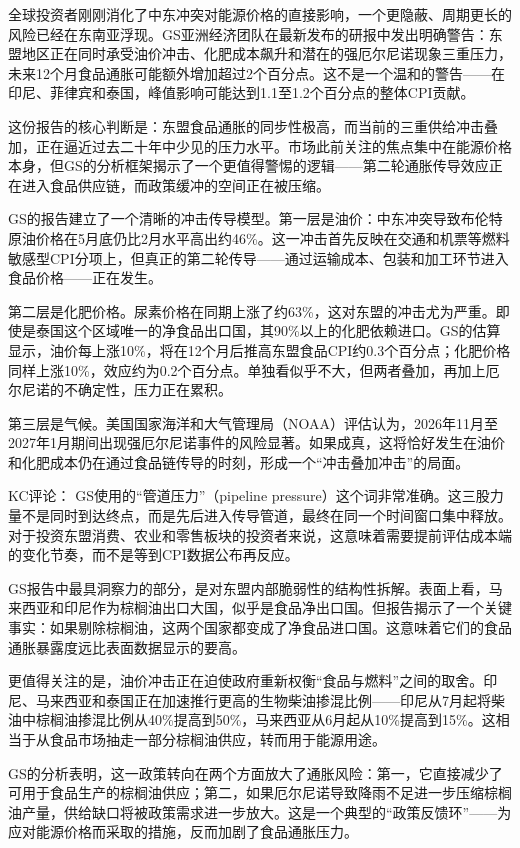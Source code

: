 \documentclass[11pt]{ctexart}
\begin{document}
全球投资者刚刚消化了中东冲突对能源价格的直接影响，一个更隐蔽、周期更长的风险已经在东南亚浮现。GS亚洲经济团队在最新发布的研报中发出明确警告：东盟地区正在同时承受油价冲击、化肥成本飙升和潜在的强厄尔尼诺现象三重压力，未来12个月食品通胀可能额外增加超过2个百分点。这不是一个温和的警告——在印尼、菲律宾和泰国，峰值影响可能达到1.1至1.2个百分点的整体CPI贡献。

这份报告的核心判断是：东盟食品通胀的同步性极高，而当前的三重供给冲击叠加，正在逼近过去二十年中少见的压力水平。市场此前关注的焦点集中在能源价格本身，但GS的分析框架揭示了一个更值得警惕的逻辑——第二轮通胀传导效应正在进入食品供应链，而政策缓冲的空间正在被压缩。

GS的报告建立了一个清晰的冲击传导模型。第一层是油价：中东冲突导致布伦特原油价格在5月底仍比2月水平高出约46\%。这一冲击首先反映在交通和机票等燃料敏感型CPI分项上，但真正的第二轮传导——通过运输成本、包装和加工环节进入食品价格——正在发生。

第二层是化肥价格。尿素价格在同期上涨了约63\%，这对东盟的冲击尤为严重。即使是泰国这个区域唯一的净食品出口国，其90\%以上的化肥依赖进口。GS的估算显示，油价每上涨10\%，将在12个月后推高东盟食品CPI约0.3个百分点；化肥价格同样上涨10\%，效应约为0.2个百分点。单独看似乎不大，但两者叠加，再加上厄尔尼诺的不确定性，压力正在累积。

第三层是气候。美国国家海洋和大气管理局（NOAA）评估认为，2026年11月至2027年1月期间出现强厄尔尼诺事件的风险显著。如果成真，这将恰好发生在油价和化肥成本仍在通过食品链传导的时刻，形成一个“冲击叠加冲击”的局面。

KC评论： GS使用的“管道压力”（pipeline pressure）这个词非常准确。这三股力量不是同时到达终点，而是先后进入传导管道，最终在同一个时间窗口集中释放。对于投资东盟消费、农业和零售板块的投资者来说，这意味着需要提前评估成本端的变化节奏，而不是等到CPI数据公布再反应。

GS报告中最具洞察力的部分，是对东盟内部脆弱性的结构性拆解。表面上看，马来西亚和印尼作为棕榈油出口大国，似乎是食品净出口国。但报告揭示了一个关键事实：如果剔除棕榈油，这两个国家都变成了净食品进口国。这意味着它们的食品通胀暴露度远比表面数据显示的要高。

更值得关注的是，油价冲击正在迫使政府重新权衡“食品与燃料”之间的取舍。印尼、马来西亚和泰国正在加速推行更高的生物柴油掺混比例——印尼从7月起将柴油中棕榈油掺混比例从40\%提高到50\%，马来西亚从6月起从10\%提高到15\%。这相当于从食品市场抽走一部分棕榈油供应，转而用于能源用途。

GS的分析表明，这一政策转向在两个方面放大了通胀风险：第一，它直接减少了可用于食品生产的棕榈油供应；第二，如果厄尔尼诺导致降雨不足进一步压缩棕榈油产量，供给缺口将被政策需求进一步放大。这是一个典型的“政策反馈环”——为应对能源价格而采取的措施，反而加剧了食品通胀压力。
\end{document}
